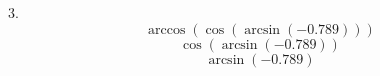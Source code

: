 \documentclass{article}
\begin{document}
3. 
\[ \arccos(\cos(\arcsin(-0.789))) \]
\[ \cos(\arcsin(-0.789)) \]
\[ \arcsin(-0.789) \]
\end{document}
